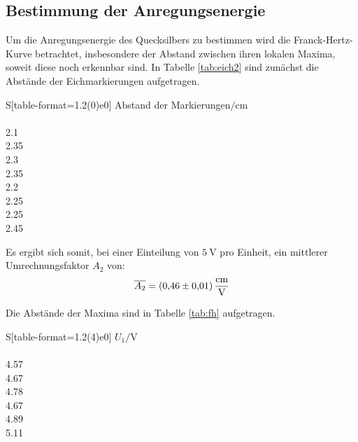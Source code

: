 \subsection{Bestimmung der Anregungsenergie}
Um die Anregungsenergie des Quecksilbers zu bestimmen wird die Franck-Hertz-Kurve betrachtet, insbesondere der Abstand zwischen ihren lokalen Maxima, soweit diese noch erkennbar sind.
In Tabelle \ref{tab:eich2} sind zunächst die Abstände der Eichmarkierungen aufgetragen.
\begin{table}[H]
    \caption{Abstände der Eichmarkierungen.}
    \label{tab:eich2}
    \centering
    \begin{tabular}{S[table-format=1.2(0)e0]}
        \toprule
{Abstand der Markierungen$/\si{\centi\meter}$} \\
		 \\
2.1 \\
2.35 \\
2.3 \\
2.35 \\
2.2 \\
2.25 \\
2.25 \\
2.45 \\
        \bottomrule
    \end{tabular}
\end{table}
\noindent
Es ergibt sich somit, bei einer Einteilung von $\SI{5}{\volt}$ pro Einheit, ein mittlerer Umrechnungsfaktor $A_2$ von:
\begin{equation}
	\overline{A_2} = \SI{0.46\pm0.01}{\centi\meter\per\volt}
\end{equation}

Die Abstände der Maxima sind in Tabelle \ref{tab:fh} aufgetragen.
\begin{table}[H]
    \caption{Messwerte der Energiekurve bei $\SI{140}{\degreeCelsius}$.}
    \label{tab:fh}
    \centering
    \begin{tabular}{S[table-format=1.2(4)e0]}
        \toprule
{$U_1/\si{\volt}$} \\
		 \\
4.57 \\
4.67 \\
4.78 \\
4.67 \\
4.89 \\
5.11 \\
       \bottomrule
    \end{tabular}
\end{table}

